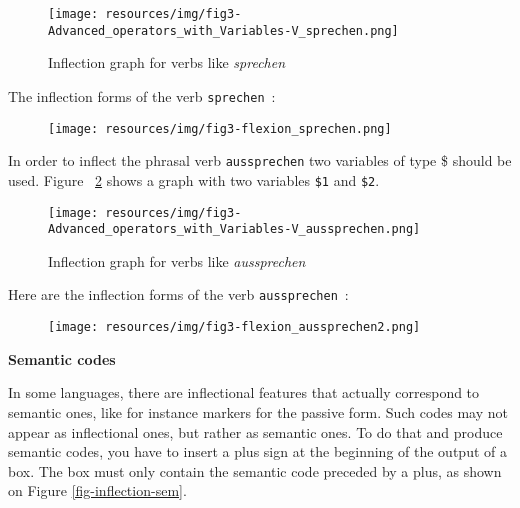 \newpage
\begin{figure}[!htbp]
\begin{center}
\texttt{[image: resources/img/fig3-Advanced\_operators\_with\_Variables-V\_sprechen.png]}
\caption{Inflection graph for verbs like {\it sprechen}
\label{fig-inflection-sprechen}}
\end{center}
\end{figure}

\noindent The inflection forms of the verb \verb+sprechen+~:

\bigskip
\begin{figure}[!ht]
\begin{center}
\texttt{[image: resources/img/fig3-flexion\_sprechen.png]}
\end{center}
\end{figure}

\noindent In order to inflect the phrasal verb  \verb+aussprechen+  two variables of type \$ should be used.
Figure ~\ref{fig-inflection-aussprechen} shows a graph with two variables \verb+$1+ and \verb+$2+.

\bigskip
\begin{figure}[!ht]
\begin{center}
\texttt{[image: resources/img/fig3-Advanced\_operators\_with\_Variables-V\_aussprechen.png]}
\caption{Inflection graph for verbs like {\it aussprechen}
\label{fig-inflection-aussprechen}}
\end{center}
\end{figure}

\noindent Here are the inflection forms of the verb \verb+aussprechen+~:
\bigskip
\begin{figure}[!ht]
\begin{center}
\texttt{[image: resources/img/fig3-flexion\_aussprechen2.png]}
\end{center}
\end{figure}

\bigskip
\noindent \textbf{Semantic codes}

\noindent In some languages, there are inflectional features that actually correspond to 
semantic ones, like for instance markers for the passive form. Such codes may not appear
as inflectional ones, but rather as semantic ones. To do that and produce semantic codes, 
you have to insert a plus sign at the beginning of the output of a box. The box must only 
contain the semantic code preceded by a plus, as shown on Figure \ref{fig-inflection-sem}.

